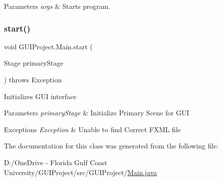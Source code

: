 \begin{DoxyParams}{Parameters}
{\em args} & Starts program. \\
\hline
\end{DoxyParams}
\mbox{\label{class_g_u_i_project_1_1_main_ac62ddcbc1f07334316eed6524523acf2}} 
\subsubsection{\texorpdfstring{start()}{start()}}
{\footnotesize\ttfamily void G\+U\+I\+Project.\+Main.\+start (\begin{DoxyParamCaption}\item[{Stage}]{primary\+Stage }\end{DoxyParamCaption}) throws Exception}

Initializes G\+UI interface


\begin{DoxyParams}{Parameters}
{\em primary\+Stage} & Initialize Primary Scene for G\+UI \\
\hline
\end{DoxyParams}

\begin{DoxyExceptions}{Exceptions}
{\em Exception} & Unable to find Correct F\+X\+ML file \\
\hline
\end{DoxyExceptions}


The documentation for this class was generated from the following file\+:\begin{DoxyCompactItemize}
\item 
D\+:/\+One\+Drive -\/ Florida Gulf Coast University/\+G\+U\+I\+Project/src/\+G\+U\+I\+Project/\mbox{\hyperlink{_main_8java}{Main.\+java}}\end{DoxyCompactItemize}
